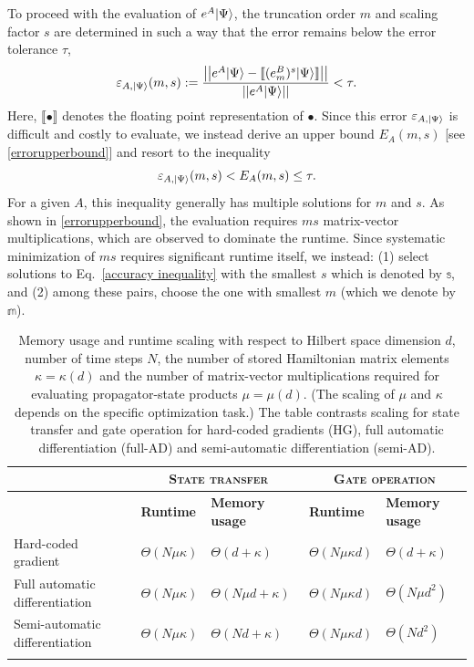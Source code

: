 To proceed with the evaluation of $e^A|\Psi\rangle$, the truncation order $m$ and scaling factor $s$ are determined in such a way that the error remains below the error tolerance $\tau$, 
\begin{equation}
\label{error defnition}
    \varepsilon_{A,|\Psi\rangle}(m,s) := \frac{\left|\left|e^A|\Psi\rangle-\llbracket (e^B_m)^s|\Psi\rangle\rrbracket\right|\right|}{\left|\left|e^A|\Psi\rangle\right|\right|}< \tau .
\end{equation}
Here, $\llbracket \bullet{}  \rrbracket$ denotes the floating point representation of $\bullet$. Since this error $\varepsilon_{A,|\Psi\rangle}$ is difficult and costly to evaluate, we instead derive an upper bound $E_A(m,s)$ [see \ref{errorupperbound}] and resort to the inequality 
\begin{equation}
\label{accuracy inequality}
    \varepsilon_{A,|\Psi\rangle}(m,s)<E_A(m,s)\leq \tau.
\end{equation}
For a given $A$, this inequality generally has multiple solutions for $m$ and $s$. As shown in  \ref{errorupperbound}, the evaluation requires $ms$ matrix-vector multiplications, which are observed to dominate the runtime. Since systematic minimization of $ms$ requires significant runtime itself, we instead: (1) select solutions to Eq.\ \eqref{accuracy inequality} with the smallest $s$ which is denoted by $\mathbb{s}$, and (2) among these pairs, choose the one with smallest $m$ (which we denote by $\mathbb{m}$). 
\begin{table}[ht]
\renewcommand{\arraystretch}{1.5}
\centering %
\caption{Memory usage and runtime scaling with respect to Hilbert space dimension $d$, number of time steps $N$,  the number of stored Hamiltonian matrix elements $\kappa=\kappa(d)$ and the number of matrix-vector multiplications required for evaluating propagator-state products $\mu=\mu(d)$. (The scaling of $\mu$ and $\kappa$ depends on the specific optimization task.) The table contrasts scaling for state transfer and gate operation for hard-coded gradients (HG), full automatic differentiation (full-AD) and semi-automatic differentiation (semi-AD). } %
\begin{tabular}
{p{}p{}p{}p{}p{}} 
\hline
\hline
& \multicolumn{2}{c}{\textbf{\textsc{State transfer}}} & \multicolumn{2}{c}{\textbf{\textsc{Gate operation}}}\\
\hline 
& \textbf{Runtime} & \textbf{Memory usage} & \textbf{Runtime} & \textbf{Memory usage}
\\
\hline
Hard-coded gradient & $\Theta(N\mu \kappa)$ & $\Theta(d+\kappa)$ & $\Theta(N\mu \kappa d)$ & $\Theta(d+\kappa)$\\ 
Full automatic differentiation & $\Theta(N\mu \kappa)$ & $\Theta(N\mu d+\kappa)$ & $\Theta(N\mu \kappa d)$ & $\Theta(N\mu d^2)$  \\
Semi-automatic differentiation & $\Theta(N\mu \kappa)$ & $\Theta(Nd+\kappa)$ & $\Theta(N\mu \kappa d)$ & $\Theta(Nd^2)$\\ 
\hline \hline
\label{scalingtable}
\end{tabular} 
\label{tablescaling}
\end{table}
